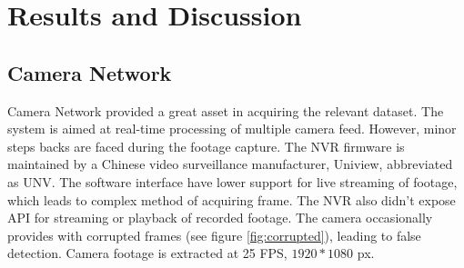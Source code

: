 \chapter{Results and Discussion}

\section{Camera Network}
Camera Network provided a great asset in acquiring the relevant dataset. The system is aimed at real-time processing of multiple camera feed. However, minor steps backs are faced during the footage capture. The NVR firmware is maintained by a Chinese video surveillance manufacturer, Uniview, abbreviated as UNV. The software interface have lower support for live streaming of footage, which leads to complex method of acquiring frame. The NVR also didn't expose API for streaming or playback of recorded footage. The camera occasionally provides with corrupted frames (see figure \ref{fig:corrupted}), leading to false detection. Camera footage is extracted at 25 FPS, $1920*1080$ px.


